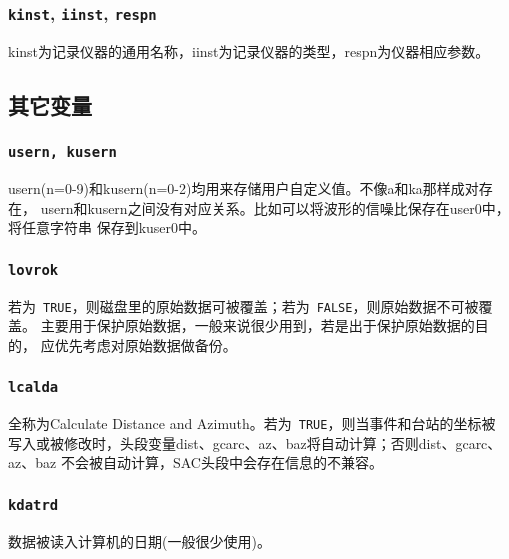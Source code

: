 \subsubsection{\texttt{kinst}, \texttt{iinst}\dag, \texttt{respn}\dag}
kinst为记录仪器的通用名称，iinst为记录仪器的类型，respn为仪器相应参数。

\subsection{其它变量}
\subsubsection{\texttt{usern, kusern}}
usern(n=0-9)和kusern(n=0-2)均用来存储用户自定义值。不像a和ka那样成对存在，
usern和kusern之间没有对应关系。比如可以将波形的信噪比保存在user0中，将任意字符串
保存到kuser0中。

\subsubsection{\texttt{lovrok}}
若为~\verb+TRUE+，则磁盘里的原始数据可被覆盖；若为~\verb+FALSE+，则原始数据不可被覆盖。
主要用于保护原始数据，一般来说很少用到，若是出于保护原始数据的目的，
应优先考虑对原始数据做备份。

\subsubsection{\texttt{lcalda}}
全称为Calculate Distance and Azimuth。若为~\verb+TRUE+，则当事件和台站的坐标被
写入或被修改时，头段变量dist、gcarc、az、baz将自动计算；否则dist、gcarc、az、baz
不会被自动计算，SAC头段中会存在信息的不兼容。

\subsubsection{\texttt{kdatrd}}
数据被读入计算机的日期(一般很少使用)。
